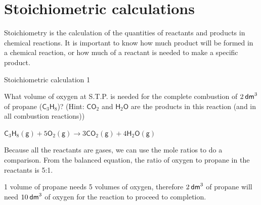             \section{Stoichiometric calculations}
            \nopagebreak
      \label{m38712*id283990}Stoichiometry is the calculation of the quantities of reactants and products in chemical reactions. It is important to know how much product will be formed in a chemical reaction, or how much of a reactant is needed to make a specific product.\par 
\label{m38712*secfhsst!!!underscore!!!id1903}\vspace{.5cm}  
      \begin{wex}{Stoichiometric calculation 1 }
{

      \label{m38712*probfhsst!!!underscore!!!id1904}
      \label{m38712*id275479}What volume of oxygen at S.T.P. is needed for the complete combustion of $2\phantom{\rule{2pt}{0ex}}{\mathsf{dm}}^{3}$ of propane ($\mathsf{C}{}_{3}\mathsf{H}{}_{8}$)? (Hint: $\mathsf{CO}{}_{2}$ and $\mathsf{H}{}_{2}\mathsf{O}$ are the products in this reaction (and in all combustion reactions))\par 
      \vspace{5pt}}
{
      \label{m38712*id284189}${\mathsf{C}}_{3}{\mathsf{H}}_{8}\left(\mathsf{g}\right)+5{\mathsf{O}}_{2}\left(\mathsf{g}\right)\to 3\mathsf{C}{\mathsf{O}}_{2}\left(\mathsf{g}\right)+4{\mathsf{H}}_{2}\mathsf{O}\left(\mathsf{g}\right)$
      \par 
      \label{m38712*id284294}Because all the reactants are gases, we can use the mole ratios to do a comparison. From the balanced equation, the ratio of oxygen to propane in the reactants is 5:1.\par 
      \label{m38712*id284304}1 volume of propane needs 5 volumes of oxygen, therefore $2\phantom{\rule{2pt}{0ex}}{\mathsf{dm}}^{3}$ of propane will need $10\phantom{\rule{2pt}{0ex}}{\mathsf{dm}}^{3}$ of oxygen for the reaction to proceed to completion.\par 
}
    \end{wex}
    \noindent
\label{m38712*secfhsst!!!underscore!!!id1972}\vspace{.5cm} 
